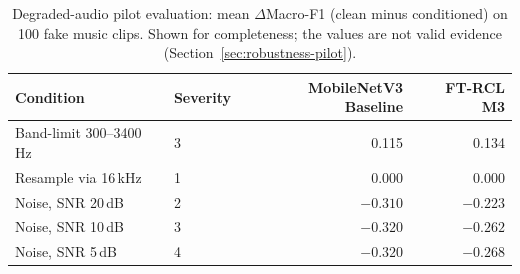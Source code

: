 \begin{table}[htbp]
\centering
\caption{Degraded-audio pilot evaluation: mean $\Delta$Macro-F1 (clean minus conditioned) on 100 fake music clips. Shown for completeness; the values are not valid evidence (Section~\ref{sec:robustness-pilot}).}
\label{tab:delta-m-summary}
\small
\begin{tabular}{@{}llrr@{}}
\toprule
Condition & Severity & MobileNetV3 Baseline & FT-RCL M3 \\
\midrule
Band-limit 300--3400\,Hz & 3 & 0.115 & 0.134 \\
Resample via 16\,kHz & 1 & 0.000 & 0.000 \\
Noise, SNR 20\,dB & 2 & $-0.310$ & $-0.223$ \\
Noise, SNR 10\,dB & 3 & $-0.320$ & $-0.262$ \\
Noise, SNR 5\,dB & 4 & $-0.320$ & $-0.268$ \\
\bottomrule
\end{tabular}
\end{table}
